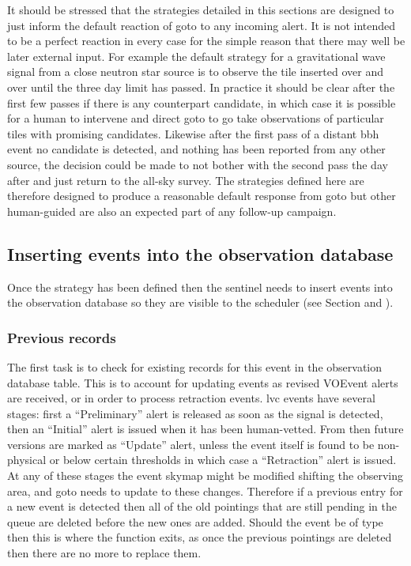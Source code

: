 \begin{colsection}
\begin{colsection}
It should be stressed that the strategies detailed in this sections are designed to just inform the default reaction of \gls{goto} to any incoming alert. It is not intended to be a perfect reaction in every case for the simple reason that there may well be later external input. For example the default strategy for a gravitational wave signal from a close neutron star source is to observe the tile inserted over and over until the three day limit has passed. In practice it should be clear after the first few passes if there is any counterpart candidate, in which case it is possible for a human to intervene and direct \gls{goto} to go take observations of particular tiles with promising candidates. Likewise after the first pass of a distant \gls{bbh} event no candidate is detected, and nothing has been reported from any other source, the decision could be made to not bother with the second pass the day after and just return to the all-sky survey. The strategies defined here are therefore designed to produce a reasonable default response from \gls{goto} but other human-guided are also an expected part of any follow-up campaign.

\end{colsection}


\subsection{Inserting events into the observation database}
\label{sec:db_insert}
\begin{colsection}

Once the strategy has been defined then the sentinel needs to insert events into the observation database so they are visible to the scheduler (see Section  and ).

\subsubsection{Previous records}

The first task is to check for existing records for this event in the observation database  table. This is to account for updating events as revised VOEvent alerts are received, or in order to process retraction events. \gls{lvc} events have several stages: first a ``Preliminary'' alert is released as soon as the signal is detected, then an ``Initial'' alert is issued when it has been human-vetted. From then future versions are marked as ``Update'' alert, unless the event itself is found to be non-physical or below certain thresholds in which case a ``Retraction'' alert is issued. At any of these stages the event skymap might be modified shifting the observing area, and \gls{goto} needs to update to these changes. Therefore if a previous entry for a new event is detected then all of the old pointings that are still pending in the queue are deleted before the new ones are added. Should the event be of type  then this is where the function exits, as once the previous pointings are deleted then there are no more to replace them.


\end{colsection}
\end{colsection}
